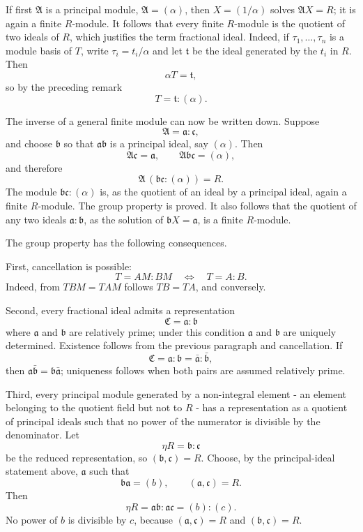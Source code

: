 \documentclass[11pt]{article}
\begin{document}
If first \(\mathfrak A\) is a principal module,
\(\mathfrak A=(\alpha)\), then \(X=(1/\alpha)\) solves
\(\mathfrak A X=R\); it is again a finite \(R\)-module. It follows that
every finite \(R\)-module is the quotient of two ideals of \(R\), which
justifies the term fractional ideal. Indeed, if \(\tau_1,\ldots,\tau_n\)
is a module basis of \(T\), write \(\tau_i=t_i/\alpha\) and let
\(\mathfrak t\) be the ideal generated by the \(t_i\) in \(R\). Then \[
  \alpha T=\mathfrak t,
\] so by the preceding remark \[
  T=\mathfrak t:(\alpha).
\]

The inverse of a general finite module can now be written down. Suppose
\[
  \mathfrak A=\mathfrak a:\mathfrak c,
\] and choose \(\mathfrak b\) so that \(\mathfrak a\mathfrak b\) is a
principal ideal, say \((\alpha)\). Then \[
  \mathfrak A\mathfrak c=\mathfrak a,
  \qquad \mathfrak A\mathfrak b\mathfrak c=(\alpha),
\] and therefore \[
  \mathfrak A\, (\mathfrak b\mathfrak c:(\alpha))=R.
\] The module \(\mathfrak b\mathfrak c:(\alpha)\) is, as the quotient of
an ideal by a principal ideal, again a finite \(R\)-module. The group
property is proved. It also follows that the quotient of any two ideals
\(\mathfrak a:\mathfrak b\), as the solution of
\(\mathfrak bX=\mathfrak a\), is a finite \(R\)-module.

The group property has the following consequences.

First, cancellation is possible: \[
  T=AM:BM \quad\Longleftrightarrow\quad T=A:B.
\] Indeed, from \(TBM=TAM\) follows \(TB=TA\), and conversely.

Second, every fractional ideal admits a representation \[
  \mathfrak C=\mathfrak a:\mathfrak b
\] where \(\mathfrak a\) and \(\mathfrak b\) are relatively prime; under
this condition \(\mathfrak a\) and \(\mathfrak b\) are uniquely
determined. Existence follows from the previous paragraph and
cancellation. If \[
  \mathfrak C=\mathfrak a:\mathfrak b=\bar{\mathfrak a}:\bar{\mathfrak b},
\] then \(\mathfrak a\bar{\mathfrak b}=\mathfrak b\bar{\mathfrak a}\);
uniqueness follows when both pairs are assumed relatively prime.

Third, every principal module generated by a non-integral element - an
element belonging to the quotient field but not to \(R\) - has a
representation as a quotient of principal ideals such that no power of
the numerator is divisible by the denominator. Let \[
  \eta R=\mathfrak b:\mathfrak c
\] be the reduced representation, so \((\mathfrak b,\mathfrak c)=R\).
Choose, by the principal-ideal statement above, \(\mathfrak a\) such
that \[
  \mathfrak b\mathfrak a=(b),
  \qquad (\mathfrak a,\mathfrak c)=R.
\] Then \[
  \eta R=\mathfrak a\mathfrak b:\mathfrak a\mathfrak c=(b):(c).
\] No power of \(b\) is divisible by \(c\), because
\((\mathfrak a,\mathfrak c)=R\) and \((\mathfrak b,\mathfrak c)=R\).
\end{document}
